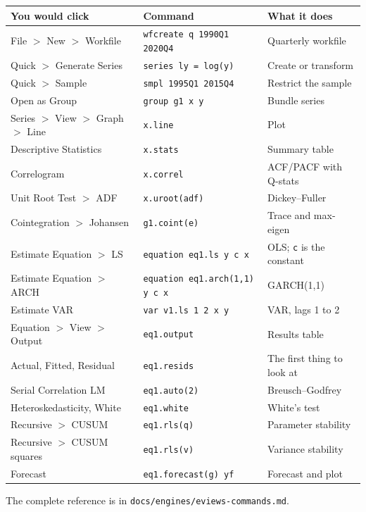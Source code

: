 \documentclass[11pt,a4paper]{report}
\begin{document}
\begin{center}
\begin{longtable}{@{}llp{5.4cm}@{}}
\toprule
\textbf{You would click} & \textbf{Command} & \textbf{What it does} \\
\midrule
\endhead
File $>$ New $>$ Workfile & \texttt{wfcreate q 1990Q1 2020Q4} & Quarterly workfile \\
Quick $>$ Generate Series & \texttt{series ly = log(y)} & Create or transform \\
Quick $>$ Sample & \texttt{smpl 1995Q1 2015Q4} & Restrict the sample \\
Open as Group & \texttt{group g1 x y} & Bundle series \\
Series $>$ View $>$ Graph $>$ Line & \texttt{x.line} & Plot \\
Descriptive Statistics & \texttt{x.stats} & Summary table \\
Correlogram & \texttt{x.correl} & ACF/PACF with Q-stats \\
Unit Root Test $>$ ADF & \texttt{x.uroot(adf)} & Dickey--Fuller \\
Cointegration $>$ Johansen & \texttt{g1.coint(e)} & Trace and max-eigen \\
Estimate Equation $>$ LS & \texttt{equation eq1.ls y c x} & OLS; \texttt{c} is the constant \\
Estimate Equation $>$ ARCH & \texttt{equation eq1.arch(1,1) y c x} & GARCH(1,1) \\
Estimate VAR & \texttt{var v1.ls 1 2 x y} & VAR, lags 1 to 2 \\
Equation $>$ View $>$ Output & \texttt{eq1.output} & Results table \\
Actual, Fitted, Residual & \texttt{eq1.resids} & The first thing to look at \\
Serial Correlation LM & \texttt{eq1.auto(2)} & Breusch--Godfrey \\
Heteroskedasticity, White & \texttt{eq1.white} & White's test \\
Recursive $>$ CUSUM & \texttt{eq1.rls(q)} & Parameter stability \\
Recursive $>$ CUSUM squares & \texttt{eq1.rls(v)} & Variance stability \\
Forecast & \texttt{eq1.forecast(g) yf} & Forecast and plot \\
\bottomrule
\end{longtable}
\end{center}

The complete reference is in \texttt{docs/engines/eviews-commands.md}.
\end{document}
